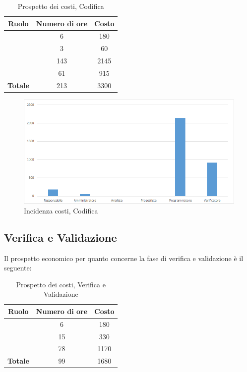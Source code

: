 \begin{table}[H]
	\begin{center}
		\begin{tabular}{|c|c|c|}
			\hline
			\textbf{Ruolo}	& \textbf{Numero di ore} & \textbf{Costo} \\
			\hline
			\Res	&	6  &	180	\\
			\hline
			\Amm	&	3  &	60	\\
			\hline
			\Progr	&	143  &	2145	\\
			\hline
			\Ver	&	61  &	915	\\
			\hline
			\textbf{Totale}  &	213 &	3300	\\
			\hline
		\end{tabular}
	\end{center}
	\caption{Prospetto dei costi, Codifica }
\end{table}

\begin{figure}[H]
	\centering
	\includegraphics[scale=0.6]{img/8-4.png}
	\caption{Incidenza costi, Codifica}
\end{figure}

\subsection{Verifica e Validazione}
Il prospetto economico per quanto concerne la fase di verifica e validazione è il seguente:


\begin{table}[H]
	\begin{center}
		\begin{tabular}{|c|c|c|}
			\hline
			\textbf{Ruolo}	& \textbf{Numero di ore} & \textbf{Costo} \\
			\hline
			\Res	&	6  &	180	\\
			\hline
			\Prog	&	15  &	330	\\
			\hline
			\Ver	&	78  &	1170	\\
			\hline
			\textbf{Totale}  &	99  &	1680	\\
			\hline
		\end{tabular}
	\end{center}
	\caption{Prospetto dei costi, Verifica e Validazione}
\end{table}

